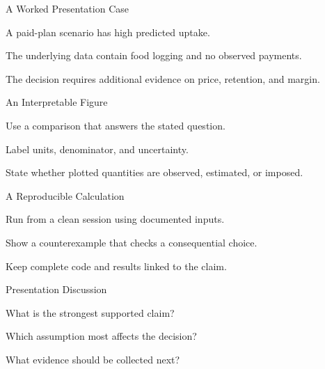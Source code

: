 \begin{frame}{A Worked Presentation Case}
\vfill
\begin{slidebullets}
\item A paid-plan scenario has high predicted uptake.
\item The underlying data contain food logging and no observed payments.
\item The decision requires additional evidence on price, retention, and margin.
\end{slidebullets}
\vfill
{}
\end{frame}
\begin{frame}{An Interpretable Figure}
\vfill
\begin{slidebullets}
\item Use a comparison that answers the stated question.
\item Label units, denominator, and uncertainty.
\item State whether plotted quantities are observed, estimated, or imposed.
\end{slidebullets}
\vfill
{}
\end{frame}
\begin{frame}{A Reproducible Calculation}
\vfill
\begin{slidebullets}
\item Run from a clean session using documented inputs.
\item Show a counterexample that checks a consequential choice.
\item Keep complete code and results linked to the claim.
\end{slidebullets}
\vfill
{}
\end{frame}
\begin{frame}{Presentation Discussion}
\vfill
\begin{slidebullets}
\item What is the strongest supported claim?
\item Which assumption most affects the decision?
\item What evidence should be collected next?
\end{slidebullets}
\vfill
{}
\end{frame}
